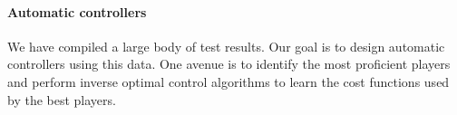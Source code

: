 \paragraph{Automatic controllers}
We have compiled a large body of test results.  Our goal is to design automatic controllers using this data. One avenue is to identify the most proficient players and perform inverse optimal control algorithms to learn the cost functions used by the best players.  


%




